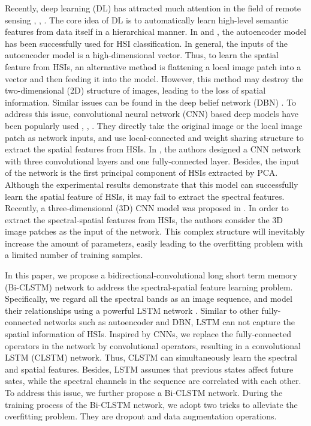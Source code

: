 \documentclass[12pt,onecolumn]{IEEEtran}
\begin{document}
\begin{spacing}{2}
Recently, deep learning (DL) has attracted much attention in the field of remote sensing \cite{Zhang2016Deep}, \cite{liu2016adaptive}, \cite{liu2016learning}. The core idea of DL is to automatically learn high-level semantic features from data itself in a hierarchical manner. In \cite{Chen2014Deep} and \cite{Tao2015Unsupervised}, the autoencoder model has been successfully used for HSI classification. In general, the inputs of the autoencoder model is a high-dimensional vector. Thus, to learn the spatial feature from HSIs, an alternative method is flattening a local image patch into a vector and then feeding it into the model. However, this method may destroy the two-dimensional (2D) structure of images, leading to the loss of spatial information. Similar issues can be found in the deep belief network (DBN) \cite{Chen2015Spectral}. To address this issue, convolutional neural network (CNN) based deep models have been popularly used \cite{Zhao2016Spectral}, \cite{Chen2016Deep}, \cite{Zhao2016Learning}. They directly take the original image or the local image patch as network inputs, and use local-connected and weight sharing structure to extract the spatial features from HSIs. In \cite{Zhao2016Spectral}, the authors designed a CNN network with three convolutional layers and one fully-connected layer. Besides, the input of the network is the first principal component of HSIs extracted by PCA. Although the experimental results demonstrate that this model can successfully learn the spatial feature of HSIs, it may fail to extract the spectral features. Recently, a three-dimensional (3D) CNN model was proposed in \cite{Chen2016Deep}. In order to extract the spectral-spatial features from HSIs, the authors consider the 3D image patches as the input of the network. This complex structure will inevitably increase the amount of parameters, easily leading to the overfitting problem with a limited number of training samples.

In this paper, we propose a bidirectional-convolutional long short term memory (Bi-CLSTM) network to address the spectral-spatial feature learning problem. Specifically, we regard all the spectral bands as an image sequence, and model their relationships using a powerful LSTM network \cite{Hochreiter1997Long}. Similar to other fully-connected networks such as autoencoder and DBN, LSTM can not capture the spatial information of HSIs. Inspired by CNNs, we replace the fully-connected operators in the network by convolutional operators, resulting in a convolutional LSTM (CLSTM) network. Thus, CLSTM can simultaneously learn the spectral and spatial features.  Besides, LSTM assumes that previous states affect future sates, while the spectral channels in the sequence are correlated with each other. To address this issue, we further propose a Bi-CLSTM network. During the training process of the Bi-CLSTM network, we adopt two tricks to alleviate the overfitting problem. They are dropout and data augmentation operations.


\end{spacing}
\end{document}
